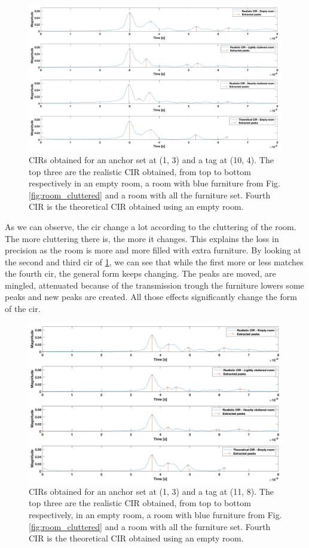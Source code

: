 \begin{figure}[H]
\centering
\includegraphics[width=.85\linewidth]{Images/cir_success_comparison.png}
\caption{CIRs obtained for an anchor set at (1, 3) and a tag at (10, 4). The top three are the realistic CIR obtained, from top to bottom respectively in an empty room, a room with blue furniture from Fig. \ref{fig:room_cluttered} and a room with all the furniture set. Fourth CIR is the theoretical CIR obtained using an empty room.  \label{fig:cir_comp_dif_room_working}}
\end{figure}

As we can observe, the \gls{cir} change a lot according to the cluttering of the room. The more cluttering there is, the more it changes. This explains the loss in precision as the room is more and more filled with extra furniture. By looking at the second and third \gls{cir} of \ref{fig:cir_comp_dif_room_working}, we can see that while the first more or less matches the fourth \gls{cir}, the general form keeps changing. The peaks are moved, are mingled, attenuated because of the transmission trough the furniture lowers some peaks and new peaks are created. All those effects significantly change the form of the \gls{cir}.

\begin{figure}[H]
\centering
\includegraphics[width=.85\linewidth]{Images/cir_failed_comparison.png}
\caption{CIRs obtained for an anchor set at (1, 3) and a tag at (11, 8). The top three are the realistic CIR obtained, from top to bottom respectively, in an empty room, a room with blue furniture from Fig. \ref{fig:room_cluttered}  and a room with all the furniture set. Fourth CIR is the theoretical CIR obtained using an empty room. \label{fig:cir_comp_dif_room_failing}}
\end{figure}

